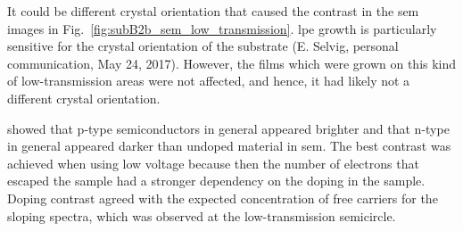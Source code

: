 It could be different crystal orientation that caused the contrast in the \ac{sem} images in Fig.~\ref{fig:subB2b_sem_low_transmission}. \Ac{lpe} growth is particularly sensitive for the crystal orientation of the substrate (E. Selvig, personal communication, May 24, 2017). However, the films which were grown on this kind of low-transmission areas were not affected, and hence, it had likely not a different crystal orientation. 

\citet{sealy2000mechanism} showed that p-type semiconductors in general appeared brighter and that n-type in general appeared darker than undoped material in \ac{sem}. The best contrast was achieved when using low voltage because then the number of electrons that escaped the sample had a stronger dependency on the doping in the sample. Doping contrast agreed with the expected concentration of free carriers for the sloping spectra, which was observed at the low-transmission semicircle.


